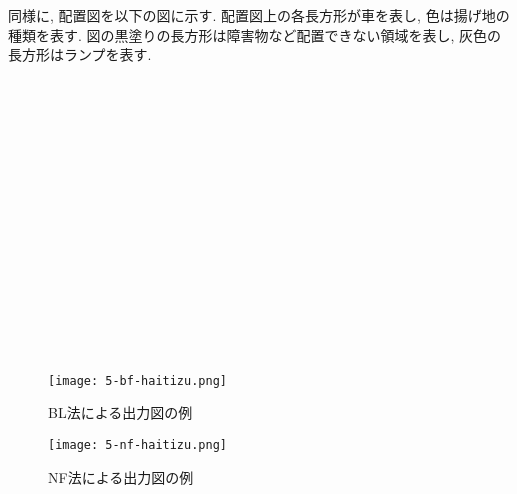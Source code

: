 同様に, 配置図を以下の図に示す. 
配置図上の各長方形が車を表し, 色は揚げ地の種類を表す. 
図の黒塗りの長方形は障害物など配置できない領域を表し, 灰色の長方形はランプを表す. \\ 
\\ \\ \\ \\ \\ \\ \\ \\ \\ \\ \\ \\ \\ 
\\ \\  



\begin{figure}[h]
    \hspace{2cm}
    \texttt{[image: 5-bf-haitizu.png]}
    \caption{BL法による出力図の例}
    \label{second-no-rei}
\end{figure}


\begin{figure}[b]
    \hspace{2cm}
    \texttt{[image: 5-nf-haitizu.png]}
    \caption{NF法による出力図の例}
    \label{nf-norei}
\end{figure}

